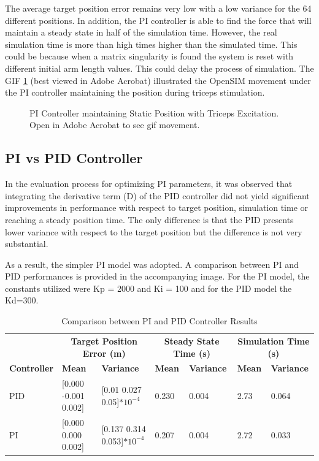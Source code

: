 The average target position error remains very low with a low variance for the 64 different positions. In addition, the PI controller is able to find the force that will maintain a steady state in half of the simulation time. However, the real simulation time is more than high times higher than the simulated time. This could be because when a matrix singularity is found the system is reset with different initial arm length values. This could delay the process of simulation. 
The GIF \ref{gif:PICONTROLLER1} (best viewed in Adobe Acrobat) illustrated the OpenSIM movement under the PI controller  maintaining the position during triceps stimulation.

\begin{figure}[h]
    \centering
    \caption{PI Controller maintaining Static Position with Triceps Excitation. Open in Adobe Acrobat to see gif movement.}
    \label{gif:PICONTROLLER1}
\end{figure}


\newpage
\subsection{PI vs PID Controller}

In the evaluation process for optimizing PI parameters, it was observed that integrating the derivative term (D) of the PID controller did not yield significant improvements in performance with respect to target position, simulation time or reaching a steady position time. The only difference is that the PID presents lower variance with respect to the target position but the difference is not very substantial. 

As a result, the simpler PI model was adopted. A comparison between PI and PID performances is provided in the accompanying image. For the PI model, the constants utilized were Kp = 2000 and Ki = 100 and for the PID model the Kd=300.

\begin{table}[h]
    \centering
    \tiny %
    \caption{Comparison between PI and PID Controller Results}
    \begin{tabularx}{\linewidth}{|l|X|X|X|X|X|X|}
        \hline
        & \multicolumn{2}{c|}{\textbf{Target Position Error (m)}} & \multicolumn{2}{c|}{\textbf{Steady State Time (s)}} & \multicolumn{2}{c|}{\textbf{Simulation Time (s)}} \\
        \cline{2-7}
        \textbf{Controller} & \textbf{Mean} & \textbf{Variance} & \textbf{Mean} & \textbf{Variance} & \textbf{Mean} & \textbf{Variance} \\
        \hline
        PID & [0.000 -0.001 0.002] & [0.01 0.027 0.05]$*10^{-4}$ &  0.230 & 0.004 & 2.73 & 0.064 \\
        \hline
        PI  & [0.000 0.000 0.002] & [0.137 0.314 0.053]$*10^{-4}$ &  0.207 & 0.004 & 2.72 & 0.033 \\
        \hline
    \end{tabularx}
\end{table}

